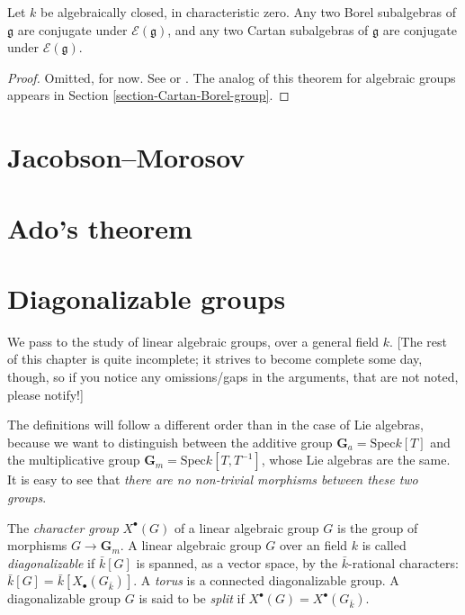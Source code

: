 \begin{theorem}
\label{theorem-conjugacy-Borel-Cartan}
 Let $k$ be algebraically closed, in characteristic zero. Any two Borel subalgebras of $\mathfrak g$ are conjugate under $\mathcal E(\mathfrak g)$, and any two Cartan subalgebras of $\mathfrak g$ are conjugate under $\mathcal E(\mathfrak g)$.
\end{theorem}

\begin{proof}
 Omitted, for now. See \cite{Humphreys-Lie} or \cite{Sternberg}. The analog of this theorem for algebraic groups appears in Section \ref{section-Cartan-Borel-group}.
\end{proof}




\section{Jacobson--Morosov}
\label{section-Jacobson-Morosov}

\section{Ado's theorem}
\label{section-Ado}


\section{Diagonalizable groups}
\label{section-diagonalizable-groups}

We pass to the study of linear algebraic groups, over a general field $k$. [The rest of this chapter is quite incomplete; it strives to become complete some day, though, so if you notice any omissions/gaps in the arguments, that are not noted, please notify!]


The definitions will follow a different order than in the case of Lie algebras, because we want to distinguish between the additive group $\mathbf G_a = \text{Spec} k[T]$ and the multiplicative group $\mathbf G_m = \text{Spec} k[T,T^{-1}]$, whose Lie algebras are the same. It is easy to see that \emph{there are no non-trivial morphisms between these two groups}. 


\begin{definition}
\label{definition-characters-diagonalizable-group} 
The {\it character group} $X^\bullet(G)$ of a linear algebraic group $G$ is the group of morphisms $G\to \mathbf G_m$. 
A linear algebraic group $G$ over an field $k$ is called \emph{diagonalizable} if $\bar k[G]$ is spanned, as a vector space, by the $\bar k$-rational characters: $\bar k[G] = \bar k[X_\bullet(G_{\bar k})]$. A {\it torus} is a connected diagonalizable group. A diagonalizable group $G$ is said to be {\it split} if $X^\bullet(G) = X^\bullet(G_{\bar k})$.
\end{definition}

